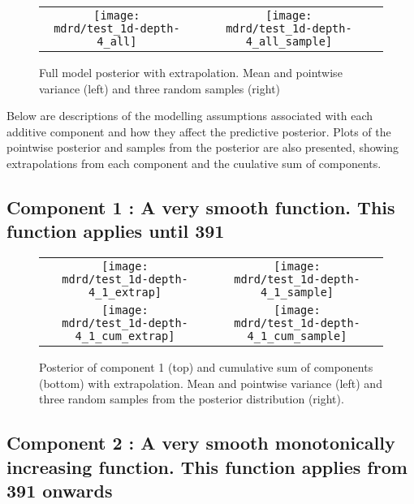 \documentclass{article} %
\begin{document}
\begin{figure}[H]
\newcommand{\wmgd}{0.5\columnwidth}
\newcommand{\hmgd}{3.0cm}
\newcommand{\mdrd}{test_1d-depth-4}
\newcommand{\mbm}{\hspace{-0.3cm}}
\begin{tabular}{cc}
\mbm \texttt{[image: \\mdrd/test\_1d-depth-4\_all]} & \texttt{[image: \\mdrd/test\_1d-depth-4\_all\_sample]}
\end{tabular}
\caption{Full model posterior with extrapolation. Mean and pointwise variance (left) and three random samples (right)}
\label{fig:extrap}
\end{figure}

Below are descriptions of the modelling assumptions associated with each additive component and how they affect the predictive posterior.
Plots of the pointwise posterior and samples from the posterior are also presented, showing extrapolations from each component and the cuulative sum of components.

\subsection{Component 1 : A very smooth function. This function applies until  391}



\begin{figure}[H]
\newcommand{\wmgd}{0.5\columnwidth}
\newcommand{\hmgd}{3.0cm}
\newcommand{\mdrd}{test_1d-depth-4}
\newcommand{\mbm}{\hspace{-0.3cm}}
\begin{tabular}{cc}
\mbm \texttt{[image: \\mdrd/test\_1d-depth-4\_1\_extrap]} & \texttt{[image: \\mdrd/test\_1d-depth-4\_1\_sample]} \\
\mbm \texttt{[image: \\mdrd/test\_1d-depth-4\_1\_cum\_extrap]} & \texttt{[image: \\mdrd/test\_1d-depth-4\_1\_cum\_sample]}
\end{tabular}
\caption{Posterior of component 1 (top) and cumulative sum of components (bottom) with extrapolation. Mean and pointwise variance (left) and three random samples from the posterior distribution (right).}
\label{fig:extrap1}
\end{figure}

\subsection{Component 2 : A very smooth monotonically increasing function. This function applies from  391 onwards}
\end{document}
